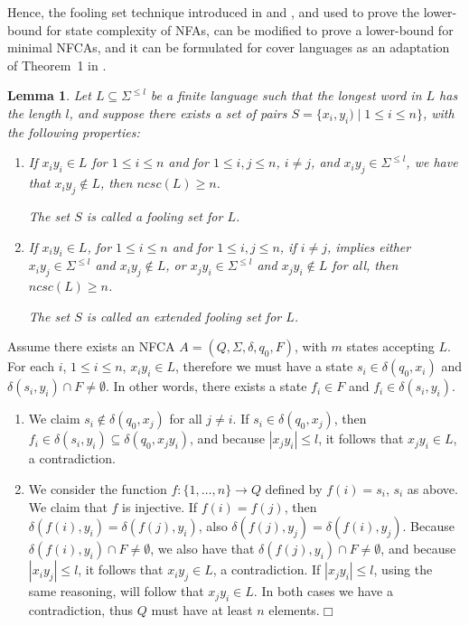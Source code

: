 \documentclass[submission,copyright,creativecommons]{eptcs}
\newtheorem{lemma}{Lemma}
\newenvironment{proof}[1][Proof]{\begin{trivlist}
\item[\hskip \labelsep {\bfseries #1}]}{\end{trivlist}}
\begin{document}
Hence, the fooling set technique introduced in \cite{Chrobak} and \cite{gramlich}, and used to prove the lower-bound 
for state complexity of NFAs, can be modified to prove 
a lower-bound for minimal NFCAs, and it can be formulated  for cover languages
as an adaptation of Theorem~1 in \cite{GruberHolzerNFAHard}.
\begin{lemma}
\label{lcfst}
Let $L\subseteq \Sigma^{\leq l}$ be a finite language such that the longest word in $L$ has the length $l$, 
and suppose there  exists a set of pairs $S=\{x_i,y_i)\mid 1\leq i\leq n\}$, with the following properties:
\begin{enumerate}
 \item 
  \label{scfst}
  If $x_i y_i\in L$ for $1\leq i\leq n$ and 
for $1\leq i,j\leq n$, $i\neq j$, and $x_iy_j\in \Sigma^{\leq l}$, we have that 
$x_iy_j\notin L$, then $ncsc(L)\geq n$. 

The set $S$ is called {\em a fooling set} for $L$.
 \item 
 \label{cfstext}
If $x_i y_i\in L$, for $1\leq i\leq n$ and for $1\leq i,j\leq n$, if $i\neq j$, implies 
either $x_iy_j\in \Sigma^{\leq l}$ and $x_iy_j\notin L$, 
or $x_jy_i\in \Sigma^{\leq l}$ and $x_jy_i\notin L$ for all, 
 then $ncsc(L)\geq n$. 

The set $S$ is called {\em an extended fooling set} for $L$.
\end{enumerate}
\end{lemma}
\begin{proof}
Assume there exists an NFCA $A=(Q,\Sigma,\delta,q_0,F)$, with $m$ states accepting $L$.
For each $i$, $1\leq i\leq n$, $x_iy_i \in L$, therefore we must have a state $s_i \in\delta(q_0,x_i)$ 
and $\delta(s_i, y_i) \cap F\neq \emptyset$.
In other words, there exists a state $f_i \in F$ and $f_i \in \delta(s_i, y_i)$. 
\begin{enumerate}
 \item We claim  $s_i\notin \delta(q_0,x_j)$ for all $j \neq i$.
If $s_i \in \delta(q_0,x_j)$,
then $f_i \in \delta(s_i,y_i) \subseteq \delta(q_0,x_jy_i)$, and because $|x_jy_i|\leq l$, it follows that 
  $x_jy_i \in  L$, a contradiction.
\item We consider the function $f:\{1,\ldots,n\}\longrightarrow Q$ 
defined by $f(i)=s_i$, $s_i$ as above.
We claim that $f$ is injective.
If $f(i)=f(j)$, then
$\delta(f(i),y_i)=\delta(f(j),y_i)$,
also 
$\delta(f(j),y_j)=\delta(f(i),y_j)$.
Because $\delta(f(i),y_i)\cap F\neq \emptyset$, we also have that $\delta(f(j),y_i)\cap F\neq \emptyset$,
and because $|x_iy_j|\leq l$, it follows that $x_iy_j\in L$, a contradiction.
If $|x_jy_i|\leq l$, using the same reasoning, will follow that $x_jy_i\in L$.
In both cases we have a contradiction, thus $Q$ must have at least $n$ elements.$\Box$
\end{enumerate}
\end{proof}
\end{document}
